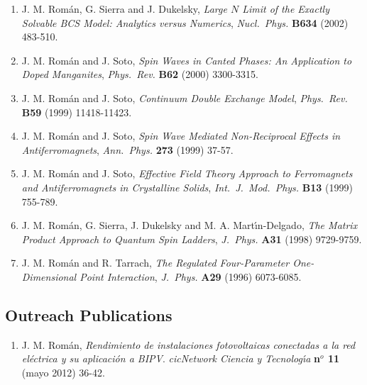 \documentclass{article}
\begin{document}
\begin{enumerate}
\item J. M. Rom\'an, G. Sierra and J. Dukelsky, 
{\it Large $N$ Limit of the Exactly Solvable BCS Model: 
Analytics versus Numerics},
{\it Nucl.~Phys.} {\bf B634} (2002) 483-510.

\item J. M. Rom\'an and J. Soto, 
{\it Spin Waves in Canted Phases: An Application to Doped Manganites}, 
{\it Phys.~Rev.} {\bf B62} (2000) 3300-3315.

\item J. M. Rom\'an and J. Soto, 
{\it Continuum Double Exchange Model},
{\it Phys.~Rev.} {\bf B59} (1999) 11418-11423.

\item J. M. Rom\'an and J. Soto, 
{\it Spin Wave Mediated Non-Reciprocal Effects in Antiferromagnets}, 
{\it Ann.~Phys.} {\bf 273} (1999) 37-57.

\item J. M. Rom\'an and J. Soto, 
{\it Effective Field Theory Approach to Ferromagnets and Antiferromagnets 
in Crystalline Solids}, 
{\it Int.~J.~Mod.~Phys.} {\bf B13} (1999) 755-789.

\item J. M. Rom\'an, G. Sierra, J. Dukelsky and M. A. Mart\'{\i}n-Delgado, 
{\it The Matrix Product Approach to Quantum Spin Ladders}, 
{\it J.~Phys.} {\bf A31} (1998) 9729-9759.

\item J. M. Rom\'an and R. Tarrach, 
{\it The Regulated Four-Parameter One-Dimensional Point Interaction}, 
{\it J.~Phys.} {\bf A29} (1996) 6073-6085.
\end{enumerate}


\subsection*{Outreach Publications}

\begin{enumerate}
\item J. M. Rom\'an,
{\it Rendimiento de instalaciones fotovoltaicas conectadas a la red el\'ectrica y su aplicaci\'on a BIPV}.
{\it cicNetwork Ciencia y Tecnolog\'{\i}a} {\bf n$^o$ 11} (mayo 2012) 36-42.
\end{enumerate}
\end{document}
